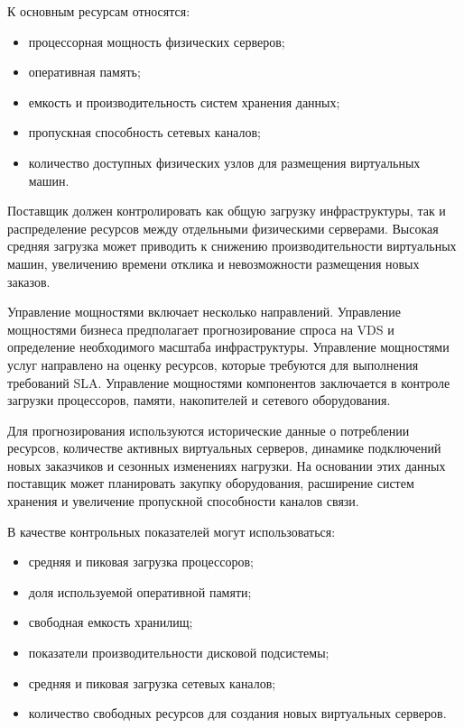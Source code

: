 \documentclass[14pt,a4paper]{extarticle}
\begin{document}
К основным ресурсам относятся:
\begin{itemize}
    \item процессорная мощность физических серверов;
    \item оперативная память;
    \item емкость и производительность систем хранения данных;
    \item пропускная способность сетевых каналов;
    \item количество доступных физических узлов для размещения виртуальных машин.
\end{itemize}

Поставщик должен контролировать как общую загрузку инфраструктуры, так и
распределение ресурсов между отдельными физическими серверами. Высокая средняя
загрузка может приводить к снижению производительности виртуальных машин,
увеличению времени отклика и невозможности размещения новых заказов.

Управление мощностями включает несколько направлений. Управление мощностями
бизнеса предполагает прогнозирование спроса на VDS и определение необходимого
масштаба инфраструктуры. Управление мощностями услуг направлено на оценку ресурсов,
которые требуются для выполнения требований SLA. Управление мощностями компонентов
заключается в контроле загрузки процессоров, памяти, накопителей и сетевого
оборудования.

Для прогнозирования используются исторические данные о потреблении ресурсов,
количестве активных виртуальных серверов, динамике подключений новых заказчиков и
сезонных изменениях нагрузки. На основании этих данных поставщик может планировать
закупку оборудования, расширение систем хранения и увеличение пропускной
способности каналов связи.

В качестве контрольных показателей могут использоваться:
\begin{itemize}
    \item средняя и пиковая загрузка процессоров;
    \item доля используемой оперативной памяти;
    \item свободная емкость хранилищ;
    \item показатели производительности дисковой подсистемы;
    \item средняя и пиковая загрузка сетевых каналов;
    \item количество свободных ресурсов для создания новых виртуальных серверов.
\end{itemize}
\end{document}
